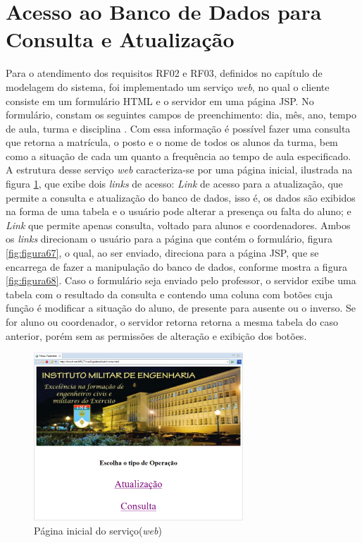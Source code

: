 \section{Acesso ao Banco de Dados para Consulta e Atualização}
Para o atendimento dos requisitos RF02 e RF03, definidos no capítulo de modelagem do sistema, foi implementado um serviço \textit{web}, no qual o cliente consiste em um formulário HTML e o servidor em uma página JSP. No formulário, constam os seguintes campos de preenchimento: dia, mês, ano, tempo de aula, turma e disciplina . Com essa informação é possível fazer uma consulta que retorna a matrícula, o posto e o nome de todos os alunos da turma, bem como a situação de cada um quanto a frequência ao tempo de aula especificado. 
A estrutura desse serviço \textit{web} caracteriza-se por uma página inicial, ilustrada na figura \ref{fig:figura66}, que exibe dois \textit{links} de acesso: 
\textit{Link} de acesso para a atualização, que permite a consulta e atualização do banco de dados, isso é, os dados são exibidos na forma de uma tabela e o usuário pode alterar a presença ou falta do aluno; e
\textit{Link} que permite apenas consulta, voltado para alunos e coordenadores.
Ambos os \textit{links} direcionam o usuário para a página que contém o formulário, figura \ref{fig:figura67}, o qual, ao ser enviado, direciona para a página JSP, que se encarrega de fazer a manipulação do banco de dados, conforme mostra a figura \ref{fig:figura68}. Caso o formulário seja enviado pelo professor, o servidor exibe uma tabela com o resultado da consulta e contendo uma coluna com botões cuja função é modificar a situação do aluno, de presente para ausente ou o inverso. Se for aluno ou coordenador, o servidor retorna retorna a mesma tabela do caso anterior, porém sem as permissões de alteração e exibição dos botões. 
\begin{figure}[!ht]
	\centering
\includegraphics[width=0.70\textwidth]{img/home_page.png}  
	\caption{Página inicial do serviço(\textit{web})}
	\label{fig:figura66}
\end{figure}

